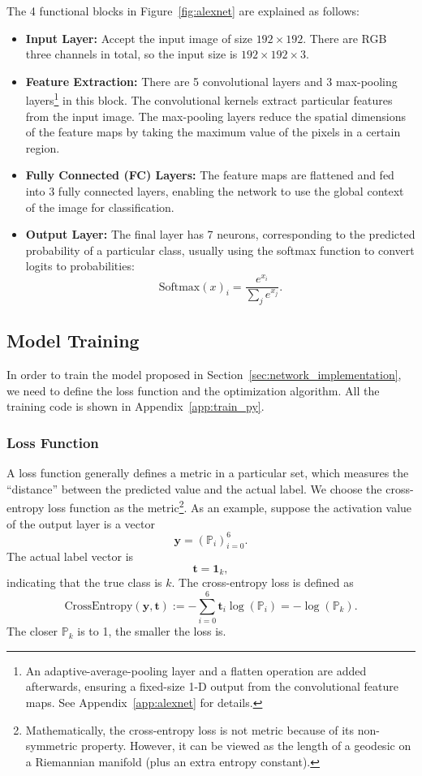 \documentclass[a4paper,12pt]{article}
\begin{document}
The 4 functional blocks in Figure~\ref{fig:alexnet} are explained as follows:

\begin{itemize}
	\item \textbf{Input Layer:} Accept the input image of size $192\times192$. There are RGB three channels in total, so the input size is $192\times192\times3$.
	\item \textbf{Feature Extraction:} There are 5 convolutional layers and 3 max-pooling layers\footnote{An adaptive-average-pooling layer and a flatten operation are added afterwards, ensuring a fixed-size 1-D output from the convolutional feature maps. See Appendix~\ref{app:alexnet} for details.} in this block. The convolutional kernels extract particular features from the input image. The max-pooling layers reduce the spatial dimensions of the feature maps by taking the maximum value of the pixels in a certain region.
	\item \textbf{Fully Connected (FC) Layers:} The feature maps are flattened and fed into 3 fully connected layers, enabling the network to use the global context of the image for classification. 
	\item \textbf{Output Layer:} The final layer has 7 neurons, corresponding to the predicted probability of a particular class, usually using the softmax function to convert logits to probabilities:
	$$
	\text{Softmax}(x)_i = \frac{e^{x_i}}{\sum_{j} e^{x_j}}.
	$$
\end{itemize}

\subsection{Model Training}

In order to train the model proposed in Section~\ref{sec:network_implementation}, we need to define the loss function and the optimization algorithm. All the training code is shown in Appendix~\ref{app:train_py}.

\subsubsection{Loss Function}

A loss function generally defines a metric in a particular set, which measures the ``distance'' between the predicted value and the actual label. We choose the cross-entropy loss function as the metric\footnote{Mathematically, the cross-entropy loss is not metric because of its non-symmetric property. However, it can be viewed as the length of a geodesic on a Riemannian manifold (plus an extra entropy constant).}. As an example, suppose the activation value of the output layer is a vector 
$$
\mathbf{y} = (\mathbb{P}_i)_{i=0}^6.
$$
The actual label vector is
$$
\mathbf{t} = \mathbf{1}_k,
$$
indicating that the true class is $k$. The cross-entropy loss is defined as
$$
\text{CrossEntropy}(\mathbf{y}, \mathbf{t}) := -\sum_{i=0}^6 \mathbf{t}_i \log(\mathbb{P}_i) = -\log(\mathbb{P}_k).
$$
The closer $\mathbb{P}_k$ is to 1, the smaller the loss is. 
\end{document}
